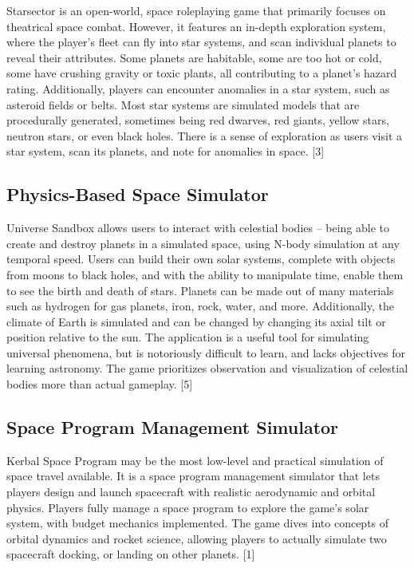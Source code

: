 Starsector is an open-world, space roleplaying game that primarily focuses on theatrical space combat. However, it features an in-depth 
exploration system, where the player’s fleet can fly into star systems, and scan individual planets to reveal their attributes. Some 
planets are habitable, some are too hot or cold, some have crushing gravity or toxic plants, all contributing to a planet’s hazard 
rating. Additionally, players can encounter anomalies in a star system, such as asteroid fields or belts. Most star systems are simulated 
models that are procedurally generated, sometimes being red dwarves, red giants, yellow stars, neutron stars, or even black holes. There 
is a sense of exploration as users visit a star system, scan its planets, and note for anomalies in space. [3]

\subsection{Physics-Based Space Simulator}

Universe Sandbox allows users to interact with celestial bodies – being able to create and destroy planets in a simulated space, 
using N-body simulation at any temporal speed. Users can build their own solar systems, complete with objects from moons to black holes, 
and with the ability to manipulate time, enable them to see the birth and death of stars. Planets can be made out of many materials such 
as hydrogen for gas planets, iron, rock, water, and more. Additionally, the climate of Earth is simulated and can be changed by changing 
its axial tilt or position relative to the sun. The application is a useful tool for simulating universal phenomena, but is notoriously 
difficult to learn, and lacks objectives for learning astronomy. The game prioritizes observation and visualization of celestial bodies 
more than actual gameplay. [5]

\subsection{Space Program Management Simulator}

Kerbal Space Program may be the most low-level and practical simulation of space travel available. It is a space program management 
simulator that lets players design and launch spacecraft with realistic aerodynamic and orbital physics. Players fully manage a space 
program to explore the game’s solar system, with budget mechanics implemented. The game dives into concepts of orbital dynamics and 
rocket science, allowing players to actually simulate two spacecraft docking, or landing on other planets. [1]


